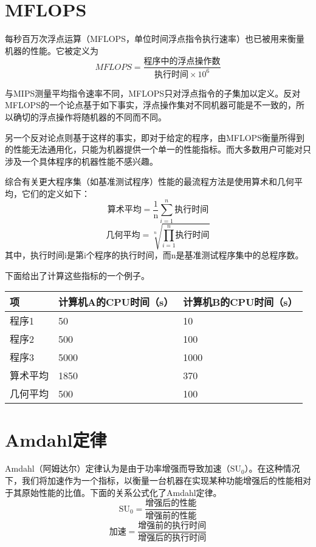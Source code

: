 \section{MFLOPS}

每秒百万次浮点运算（MFLOPS，单位时间浮点指令执行速率）也已被用来衡量机器的性能。它被定义为
$$MFLOPS=\frac{\text{程序中的浮点操作数}}{\text{执行时间}\times \text{10}^6}$$

与MIPS测量平均指令速率不同，MFLOPS只对浮点指令的子集加以定义。反对MFLOPS的一个论点基于如下事实，浮点操作集对不同机器可能是不一致的，所以确切的浮点操作将随机器的不同而不同。

另一个反对论点则基于这样的事实，即对于给定的程序，由MFLOPS衡量所得到的性能无法通用化，只能为机器提供一个单一的性能指标。而大多数用户可能对只涉及一个具体程序的机器性能不感兴趣。

综合有关更大程序集（如基准测试程序）性能的最流程方法是使用算术和几何平均，它们的定义如下：
$$\text{算术平均}=\frac{1}{\text{n}}\sum\limits^n_{i=1}\text{执行时间}$$
$$\text{几何平均}=\sqrt[n]{\prod\limits_{i=1}^n\text{执行时间}}$$
其中，执行时间i是第i个程序的执行时间，而n是基准测试程序集中的总程序数。

下面给出了计算这些指标的一个例子。

\begin{table}[htbp]
\centering
\begin{tabular}{|l|l|l|}
\hline
项		& 计算机A的CPU时间（s）	& 计算机B的CPU时间（s）	\\
\hline
程序1	& 50						& 10						\\
\hline
程序2	& 500						& 100						\\
\hline
程序3	& 5000						& 1000						\\
\hline
算术平均&1850						& 370						\\
\hline
几何平均&500						& 100						\\
\hline
\end{tabular}
\end{table}

\section{Amdahl定律}

Amdahl（阿姆达尔）定律认为是由于功率增强而导致加速（$\text{SU}_0$）。在这种情况下，我们将加速作为一个指标，以衡量一台机器在实现某种功能增强后的性能相对于其原始性能的比值。下面的关系公式化了Amdahl定律。
$$\text{SU}_0=\frac{\text{增强后的性能}}{\text{增强前的性能}}$$
$$\text{加速}=\frac{\text{增强前的执行时间}}{\text{增强后的执行时间}}$$

